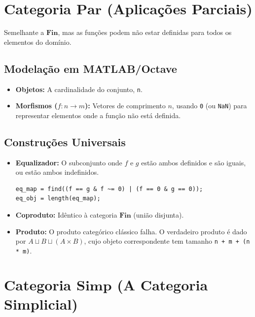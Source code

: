 \documentclass[11pt,a4paper]{article}
\begin{document}
\section{Categoria $\mathbf{Par}$ (Aplicações Parciais)}

Semelhante a $\mathbf{Fin}$, mas as funções podem não estar definidas para todos os elementos do domínio.

\subsection{Modelação em MATLAB/Octave}
\begin{itemize}
    \item \textbf{Objetos:} A cardinalidade do conjunto, \texttt{n}.
    \item \textbf{Morfismos ($f: n \to m$):} Vetores de comprimento $n$, usando \texttt{0} (ou \texttt{NaN}) para representar elementos onde a função não está definida.
\end{itemize}

\subsection{Construções Universais}
\begin{itemize}
    \item \textbf{Equalizador:} O subconjunto onde $f$ e $g$ estão ambos definidos e são iguais, ou estão ambos indefinidos.
\begin{lstlisting}
eq_map = find((f == g & f ~= 0) | (f == 0 & g == 0));
eq_obj = length(eq_map);
\end{lstlisting}
    \item \textbf{Coproduto:} Idêntico à categoria $\mathbf{Fin}$ (união disjunta).
    \item \textbf{Produto:} O produto categórico clássico falha. O verdadeiro produto é dado por $A \sqcup B \sqcup (A \times B)$, cujo objeto correspondente tem tamanho \texttt{n + m + (n * m)}.
\end{itemize}
\paragraph{}
\paragraph{}

\section{Categoria $\mathbf{Simp}$ (A Categoria Simplicial)}
\end{document}
